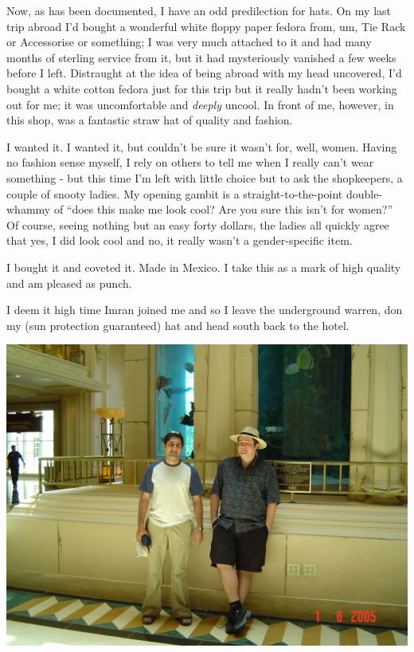 \documentclass[a5paper,titlepage,11pt]{book}
\begin{document}
Now, as has been documented, I have an odd predilection for hats.  On my last trip abroad I'd bought a wonderful white floppy paper fedora from, um, Tie Rack or Accessorise or something; I was very much attached to it and had many months of sterling service from it, but it had mysteriously vanished a few weeks before I left.  Distraught at the idea of being abroad with my head uncovered, I'd bought a white cotton fedora just for this trip but it really hadn't been working out for me; it was uncomfortable and \emph{deeply} uncool.  In front of me, however, in this shop, was a fantastic straw hat of quality and fashion.

I wanted it.  I wanted it, but couldn't be sure it wasn't for, well, women.  Having no fashion sense myself, I rely on others to tell me when I really can't wear something - but this time I'm left with little choice but to ask the shopkeepers, a couple of snooty ladies.  My opening gambit is a straight-to-the-point double-whammy of ``does this make me look cool?  Are you sure this isn't for women?''  Of course, seeing nothing but an easy forty dollars, the ladies all quickly agree that yes, I did look cool and no, it really wasn't a gender-specific item.

I bought it and coveted it.  Made in Mexico. I take this as a mark of high quality and am pleased as punch.

I deem it high time Imran joined me and so I leave the underground warren, don my (sun protection guaranteed) hat and head south back to the hotel.

\begin{center}\includegraphics[width=\textwidth]{gfx/DSC00685}\end{center}
\end{document}
